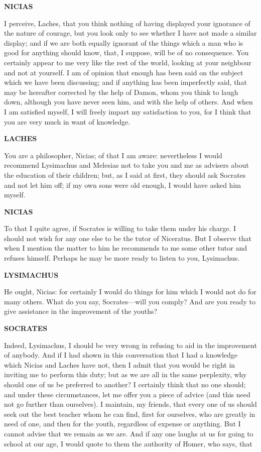 \documentclass[11pt,letter]{book}
\begin{document}
\par \textbf{NICIAS}
\par   I perceive, Laches, that you think nothing of having displayed your ignorance of the nature of courage, but you look only to see whether I have not made a similar display; and if we are both equally ignorant of the things which a man who is good for anything should know, that, I suppose, will be of no consequence. You certainly appear to me very like the rest of the world, looking at your neighbour and not at yourself. I am of opinion that enough has been said on the subject which we have been discussing; and if anything has been imperfectly said, that may be hereafter corrected by the help of Damon, whom you think to laugh down, although you have never seen him, and with the help of others. And when I am satisfied myself, I will freely impart my satisfaction to you, for I think that you are very much in want of knowledge.

\par \textbf{LACHES}
\par   You are a philosopher, Nicias; of that I am aware:  nevertheless I would recommend Lysimachus and Melesias not to take you and me as advisers about the education of their children; but, as I said at first, they should ask Socrates and not let him off; if my own sons were old enough, I would have asked him myself.

\par \textbf{NICIAS}
\par   To that I quite agree, if Socrates is willing to take them under his charge. I should not wish for any one else to be the tutor of Niceratus. But I observe that when I mention the matter to him he recommends to me some other tutor and refuses himself. Perhaps he may be more ready to listen to you, Lysimachus.

\par \textbf{LYSIMACHUS}
\par   He ought, Nicias:  for certainly I would do things for him which I would not do for many others. What do you say, Socrates—will you comply? And are you ready to give assistance in the improvement of the youths?

\par \textbf{SOCRATES}
\par   Indeed, Lysimachus, I should be very wrong in refusing to aid in the improvement of anybody. And if I had shown in this conversation that I had a knowledge which Nicias and Laches have not, then I admit that you would be right in inviting me to perform this duty; but as we are all in the same perplexity, why should one of us be preferred to another? I certainly think that no one should; and under these circumstances, let me offer you a piece of advice (and this need not go further than ourselves). I maintain, my friends, that every one of us should seek out the best teacher whom he can find, first for ourselves, who are greatly in need of one, and then for the youth, regardless of expense or anything. But I cannot advise that we remain as we are. And if any one laughs at us for going to school at our age, I would quote to them the authority of Homer, who says, that
\end{document}
